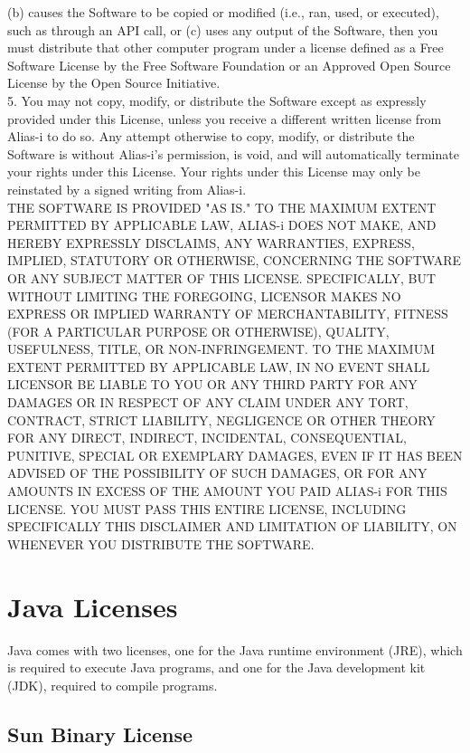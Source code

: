 {(b) causes the Software to be copied or modified (i.e., ran, used, or
executed), such as through an API call, or (c) uses any output of the
Software, then you must distribute that other computer program under a
license defined as a Free Software License by the Free Software
Foundation or an Approved Open Source License by the Open Source
Initiative.
\\[8pt]
5. You may not copy, modify, or distribute the Software except as
expressly provided under this License, unless you receive a different
written license from Alias-i to do so.  Any attempt otherwise to copy,
modify, or distribute the Software is without Alias-i's permission, is
void, and will automatically terminate your rights under this License.
Your rights under this License may only be reinstated by a signed
writing from Alias-i.
\\[8pt]
THE SOFTWARE IS PROVIDED "AS IS." TO THE MAXIMUM EXTENT PERMITTED BY
APPLICABLE LAW, ALIAS-i DOES NOT MAKE, AND HEREBY EXPRESSLY DISCLAIMS,
ANY WARRANTIES, EXPRESS, IMPLIED, STATUTORY OR OTHERWISE, CONCERNING
THE SOFTWARE OR ANY SUBJECT MATTER OF THIS LICENSE.  SPECIFICALLY, BUT
WITHOUT LIMITING THE FOREGOING, LICENSOR MAKES NO EXPRESS OR IMPLIED
WARRANTY OF MERCHANTABILITY, FITNESS (FOR A PARTICULAR PURPOSE OR
OTHERWISE), QUALITY, USEFULNESS, TITLE, OR NON-INFRINGEMENT.  TO THE
MAXIMUM EXTENT PERMITTED BY APPLICABLE LAW, IN NO EVENT SHALL LICENSOR
BE LIABLE TO YOU OR ANY THIRD PARTY FOR ANY DAMAGES OR IN RESPECT OF
ANY CLAIM UNDER ANY TORT, CONTRACT, STRICT LIABILITY, NEGLIGENCE OR
OTHER THEORY FOR ANY DIRECT, INDIRECT, INCIDENTAL, CONSEQUENTIAL,
PUNITIVE, SPECIAL OR EXEMPLARY DAMAGES, EVEN IF IT HAS BEEN ADVISED OF
THE POSSIBILITY OF SUCH DAMAGES, OR FOR ANY AMOUNTS IN EXCESS OF THE
AMOUNT YOU PAID ALIAS-i FOR THIS LICENSE.  YOU MUST PASS THIS ENTIRE
LICENSE, INCLUDING SPECIFICALLY THIS DISCLAIMER AND LIMITATION OF
LIABILITY, ON WHENEVER YOU DISTRIBUTE THE SOFTWARE.
}



\section{Java Licenses}

\setlength{\baselineskip}{\oldbaselineskip}
\noindent
Java comes with two licenses, one for the Java runtime environment
(JRE), which is required to execute Java programs, and one for the
Java development kit (JDK), required to compile programs.

\subsection{Sun Binary License}

